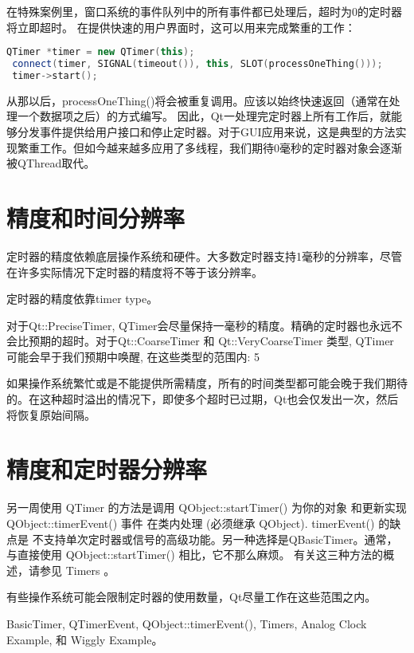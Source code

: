 在特殊案例里，窗口系统的事件队列中的所有事件都已处理后，超时为0的定时器将立即超时。 在提供快速的用户界面时，这可以用来完成繁重的工作：

\begin{lstlisting}[language=C++]
 QTimer *timer = new QTimer(this);
 connect(timer, SIGNAL(timeout()), this, SLOT(processOneThing()));
 timer->start();
\end{lstlisting}

从那以后，processOneThing()将会被重复调用。应该以始终快速返回（通常在处理一个数据项之后）的方式编写。 因此，Qt一处理完定时器上所有工作后，就能够分发事件提供给用户接口和停止定时器。对于GUI应用来说，这是典型的方法实现繁重工作。但如今越来越多应用了多线程，我们期待0毫秒的定时器对象会逐渐被QThread取代。

\section{精度和时间分辨率}

定时器的精度依赖底层操作系统和硬件。大多数定时器支持1毫秒的分辨率，尽管在许多实际情况下定时器的精度将不等于该分辨率。

定时器的精度依靠timer type。

对于Qt::PreciseTimer, QTimer会尽量保持一毫秒的精度。精确的定时器也永远不会比预期的超时。对于Qt::CoarseTimer 和 Qt::VeryCoarseTimer 类型, QTimer 可能会早于我们预期中唤醒, 在这些类型的范围内: 5%

如果操作系统繁忙或是不能提供所需精度，所有的时间类型都可能会晚于我们期待的。在这种超时溢出的情况下，即使多个超时已过期，Qt也会仅发出一次，然后将恢复原始间隔。

\section{精度和定时器分辨率}

另一周使用 QTimer 的方法是调用 QObject::startTimer() 为你的对象 和更新实现QObject::timerEvent() 事件 在类内处理 (必须继承 QObject). timerEvent() 的缺点是 不支持单次定时器或信号的高级功能。另一种选择是QBasicTimer。通常，与直接使用 QObject::startTimer() 相比，它不那么麻烦。 有关这三种方法的概述，请参见 Timers 。

有些操作系统可能会限制定时器的使用数量，Qt尽量工作在这些范围之内。

\begin{notice}[另请参阅]
BasicTimer, QTimerEvent, QObject::timerEvent(), Timers, Analog Clock Example, 和 Wiggly Example。
\end{notice}

